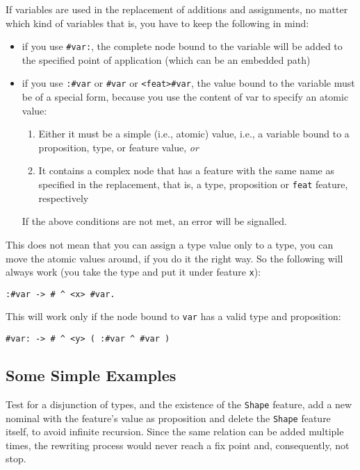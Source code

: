 \documentclass[11pt,a4paper]{article}
\newcommand{\cd}[1]{\texttt{#1}}
\begin{document}
If variables are used in the replacement of additions and assignments, no
matter which kind of variables that is, you have to keep the following in mind:

\begin{itemize}
\item if you use \texttt{\#var:}, the complete node bound to the variable will
  be added to the specified point of application (which can be an embedded
  path)
\item if you use \texttt{:\#var} or \texttt{\#var} or \texttt{<feat>\#var}, the
  value bound to the variable must be of a special form, because you use the
  content of var to specify an atomic value:
  \begin{enumerate}
  \item Either it must be a simple (i.e., atomic) value, i.e., a variable bound
    to a proposition, type, or feature value, \emph{or}
  \item It contains a complex node that has a feature with the same name as
    specified in the replacement, that is, a type, proposition or \texttt{feat}
    feature, respectively
  \end{enumerate}
  If the above conditions are not met, an error will be signalled.
\end{itemize}

This does not mean that you can assign a type value only to a type, you can
move the atomic values around, if you do it the right way.  So the following
will always work (you take the type and put it under feature \texttt{x}):
\begin{verbatim}
:#var -> # ^ <x> #var.
\end{verbatim}

This will work only if the node bound to \texttt{var} has a valid type and
proposition:
\begin{verbatim}
#var: -> # ^ <y> ( :#var ^ #var )
\end{verbatim}

\subsection{Some Simple Examples}

Test for a disjunction of types, and the existence of the \cd{Shape} feature,
add a new nominal with the feature's value as proposition and delete the
\cd{Shape} feature itself, to avoid infinite recursion. Since the same
relation can be added multiple times, the rewriting process would never reach
a fix point and, consequently, not stop.
\end{document}
